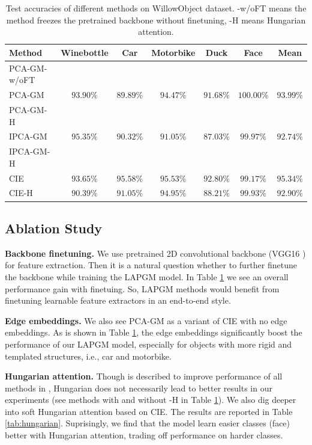 \documentclass[a4paper]{article}
\begin{document}
\begin{table}[htbp]
    \centering
    \begin{tabular}{lcccccc}
        \toprule
        Method& Winebottle& Car& Motorbike& Duck& Face& Mean\\
        \midrule
        PCA-GM-w/oFT&\\
        PCA-GM& $93.90\%$& $89.89\%$& $94.47\%$& $91.68\%$& $\mathbf{100.00\%}$& $93.99\%$\\
        PCA-GM-H& \\
        IPCA-GM& $\mathbf{95.35\%}$& $90.32\%$& $91.05\%$& $87.03\%$& $99.97\%$&$92.74\%$ \\
        IPCA-GM-H& \\
        CIE& $93.65\%$& $\mathbf{95.58\%}$& $\mathbf{95.53\%}$& $\mathbf{92.80\%}$& $99.17\%$& $\mathbf{95.34\%}$\\
        CIE-H& $90.39\%$& $91.05\%$& $94.95\%$& $88.21\%$& $99.93\%$& $92.90\%$\\
        \bottomrule
    \end{tabular}
    \caption{Test accuracies of different methods on WillowObject dataset. -w/oFT means the method freezes the pretrained backbone without finetuning, -H means Hungarian attention.}
    \label{tab:compare}
\end{table}

\subsection{Ablation Study}
\textbf{Backbone finetuning.}
We use pretrained 2D convolutional backbone (VGG16 \cite{vgg}) for feature extraction. Then it is a natural question whether to further finetune the backbone while training the LAPGM model. In Table \ref{tab:compare} we see an overall performance gain with finetuing. So, LAPGM methods would benefit from finetuning learnable feature extractors in an end-to-end style.

\textbf{Edge embeddings.} 
We also see PCA-GM as a variant of CIE with no edge embeddings. As is shown in Table \ref{tab:compare}, the edge embeddings significantly boost the performance of our LAPGM model, especially for objects with more rigid and templated structures, i.e., car and motorbike.

\textbf{Hungarian attention.}
Though is described to improve performance of all methods in \cite{cie}, Hungarian does not necessarily lead to better results in our experiments (see methods with and without -H in Table \ref{tab:compare}). We also dig deeper into soft Hungarian attention based on CIE. The results are reported in Table \ref{tab:hungarian}. Suprisingly, we find that the model learn easier classes (face) better with Hungarian attention, trading off performance on harder classes. 
\end{document}
